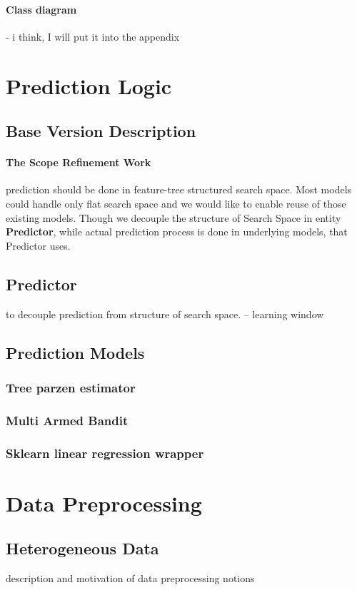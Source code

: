 \paragraph{Class diagram} - i think, I will put it into the appendix


\section{Prediction Logic}\label{implementation: prediction logic}
\subsection{Base Version Description}
\paragraph{The Scope Refinement Work} prediction should be done in feature-tree structured search space. Most models could handle only flat search space and we would like to enable reuse of those existing models. Though we decouple the structure of Search Space in entity \textbf{Predictor}, while actual prediction process is done in underlying models, that Predictor uses.

\subsection{Predictor}
to decouple prediction from structure of search space.
-- learning window

\subsection{Prediction Models}
\subsubsection{Tree parzen estimator}
\subsubsection{Multi Armed Bandit}
\subsubsection{Sklearn linear regression wrapper}


\section{Data Preprocessing}
\subsection{Heterogeneous Data} description and motivation of data preprocessing notions

